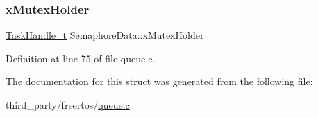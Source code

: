 \subsubsection{\texorpdfstring{x\+Mutex\+Holder}{xMutexHolder}}
{\footnotesize\ttfamily \hyperlink{task_8h_a25b35e6e19ecf894173e7ff95edb96ef}{Task\+Handle\+\_\+t} Semaphore\+Data\+::x\+Mutex\+Holder}



Definition at line 75 of file queue.\+c.



The documentation for this struct was generated from the following file\+:\begin{DoxyCompactItemize}
\item 
third\+\_\+party/freertos/\hyperlink{queue_8c}{queue.\+c}\end{DoxyCompactItemize}
